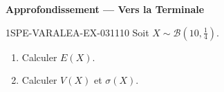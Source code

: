 \begin{center}\textbf{Approfondissement — Vers la Terminale}\end{center}
\begin{exercice}{1SPE-VARALEA-EX-031}{1}{10}
Soit $X \sim \mathcal{B}(10, \frac{1}{4})$.

\begin{enumerate}
  \item Calculer $E(X)$.
  \item Calculer $V(X)$ et $\sigma(X)$.
\end{enumerate}
\end{exercice}
